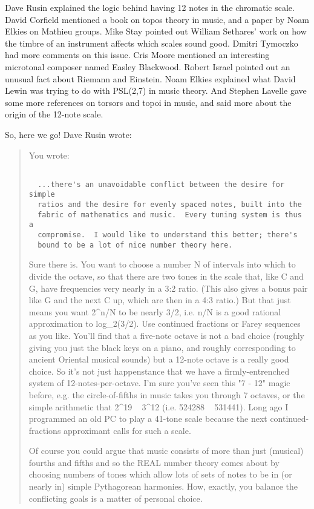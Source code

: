Dave Rusin explained the logic behind having 12 notes in the chromatic
scale.  David Corfield mentioned a book on topos theory in music, and
a paper by Noam Elkies on Mathieu groups.  Mike Stay pointed out William
Sethares' work on how the timbre of an instrument affects which scales
sound good.  Dmitri Tymoczko had more comments on this issue.  Cris Moore
mentioned an interesting microtonal composer named Easley Blackwood.
Robert Israel pointed out an unusual fact about Riemann and Einstein.
Noam Elkies explained what David Lewin was trying to do with PSL(2,7) in
music theory.  And Stephen Lavelle gave some more references on torsors
and topoi in music, and said more about the origin of the 12-note scale.

So, here we go!  Dave Rusin wrote:

\begin{quote}
You wrote:


\begin{verbatim}

  ...there's an unavoidable conflict between the desire for simple 
  ratios and the desire for evenly spaced notes, built into the 
  fabric of mathematics and music.  Every tuning system is thus a
  compromise.  I would like to understand this better; there's 
  bound to be a lot of nice number theory here.
\end{verbatim}
    

Sure there is. You want to choose a number  N  of intervals into
which to divide the octave, so that there are two tones in the scale
that, like  C  and  G,  have frequencies very nearly in a 3:2 ratio.
(This also gives a bonus pair like  G  and the next  C  up, which are
then in a 4:3 ratio.)  But that just means you want  2^{n/N}  to be
nearly  3/2, i.e.  n/N  is a good rational approximation to 
log_{2}(3/2).
Use continued fractions or Farey sequences as you like. You'll find
that a five-note octave is not a bad choice (roughly giving you just
the black keys on a piano, and roughly corresponding to ancient Oriental
musical sounds) but a 12-note octave is a really good choice. So it's
not just happenstance that we have a firmly-entrenched system of
12-notes-per-octave. I'm sure you've seen this "7 - 12" magic before,
e.g. the circle-of-fifths in music takes you through 7 octaves, or
the simple arithmetic that  2^{19} ~ 3^{12} 
(i.e. 524288 ~ 531441).
Long ago I programmed an old PC to play a 41-tone scale because the
next continued-fractions approximant calls for such a scale.

Of course you could argue that music consists of more than just
(musical) fourths and fifths and so the REAL number theory comes about
by choosing numbers of tones which allow lots of sets of notes to
be in (or nearly in) simple Pythagorean harmonies. How, exactly, you
balance the conflicting goals is a matter of personal choice.


\end{quote}
